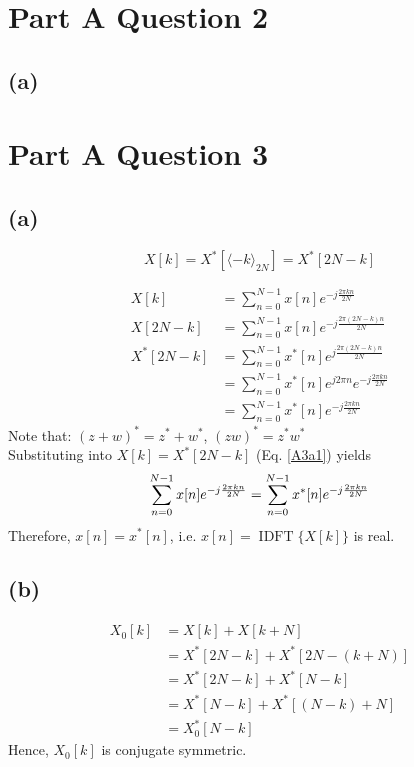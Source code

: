 \documentclass{article}
\DeclareMathOperator{\IDFT}{IDFT}
\newenvironment{homeworkProblem}[1]{
	\section*{#1}
	}{
}
\newenvironment{homeworkSection}[1]{
	\subsection*{#1}
	}{
}
\begin{document}
\begin{homeworkProblem}{Part A Question 2}
\begin{homeworkSection}{(a)}
\end{homeworkSection}


\end{homeworkProblem}


\begin{homeworkProblem}{Part A Question 3}


\begin{homeworkSection}{(a)}

\begin{equation}\label{A3a1}
X[k] = X^*[\langle-k\rangle_{2N}] = X^*[2N-k]
\end{equation}

\begin{align*}
X[k] &= \sum_{n=0}^{N-1} x[n] e^{-j \frac{2 \pi kn}{2N} }\\
X[2N-k] &= \sum_{n=0}^{N-1} x[n] e^{-j \frac{2 \pi (2N-k) n}{2N} }\\
X^*[2N-k] &= \sum_{n=0}^{N-1} x^*[n] e^{j \frac{2 \pi (2N-k) n}{2N} }\\
&= \sum_{n=0}^{N-1} x^*[n] e^{j 2 \pi n} e^{-j \frac{2 \pi kn}{2N} }\\
&= \sum_{n=0}^{N-1} x^*[n] e^{-j \frac{2 \pi kn}{2N}}
\end{align*}
Note that: $(z+w)^* = z^* + w^*$, $(zw)^* = z^* w^*$\\

Substituting into $X[k] = X^*[2N-k]$ (Eq. \ref{A3a1}) yields
\begin{equation}
\sum_{n=0}^{N-1} x[n] e^{-j \frac{2 \pi kn}{2N} } = \sum_{n=0}^{N-1} x^*[n] e^{-j \frac{2 \pi kn}{2N}}\\
\end{equation}
Therefore, $x[n] = x^*[n]$, i.e. $x[n]=\IDFT\{X[k]\}$ is real.

\end{homeworkSection}


\begin{homeworkSection}{(b)}

\begin{align*}
X_0[k] &= X[k] + X[k+N]\\
&= X^*[2N-k] + X^*[2N-(k+N)]\\
&= X^*[2N-k] + X^*[N-k]\\
&= X^*[N-k] + X^*[(N-k)+N]\\
&= X_0^*[N-k]
\end{align*}
Hence, $X_0[k]$ is conjugate symmetric.


\end{homeworkSection}
\end{homeworkProblem}
\end{document}
